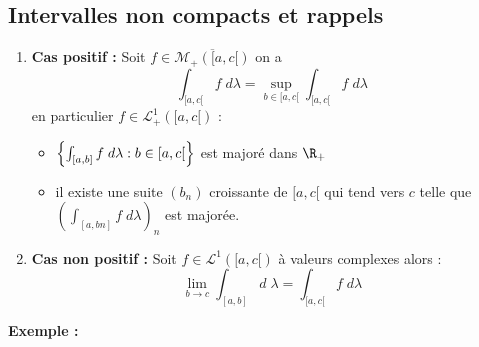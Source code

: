 \subsection{Intervalles non compacts et rappels}
\begin{theorem}
    \begin{enumerate}
        \item \textbf{Cas positif :} Soit $f \in \overline{\mathcal{M}_+([a,c[)}$ on a 
        \[ \boxed{ \int_{[a,c[} f \; d \lambda = \underset{b \in [a,c[}{\sup} \int_{[a,c[} f \; d \lambda} \]
        en particulier $ f \in \mathcal{L}^1_+([a,c[)$ :
        \begin{itemize}
            \item[\underline{ssi}] $\Bigl\{ \int_{[a,b]} f \; d \lambda : b \in [a,c[ \Bigr\}$ est majoré dans $\R_+$ 
            \item[\underline{ssi}] il existe une suite $(b_n)$ croissante de $[a,c[$ qui tend vers $c$ telle que $ (\int_{[a,bn]} f \; d \lambda)_n$ est majorée.
        \end{itemize}
        \item \textbf{Cas non positif :} Soit $ f \in \mathcal{L}^1([a,c[)$ à valeurs complexes alors :
            \[ \boxed{ \lim_{b \to c} \int_{[a,b]} d \; \lambda = \int_{[a,c[} f \; d \lambda} \] 
    \end{enumerate}
\end{theorem}

\textbf{Exemple :}

